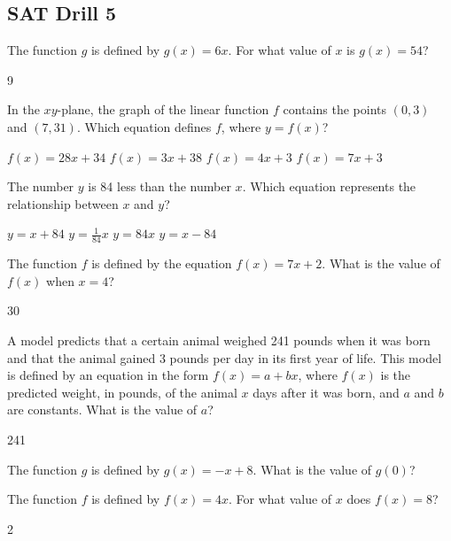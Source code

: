 
\subsection*{SAT Drill 5}

\question[1]
The function $g$ is defined by $g(x)=6x$. For what value of $x$ is $g(x)=54$?
\begin{solution}
9
\end{solution}

\question[1]
In the $xy$-plane, the graph of the linear function $f$ contains the points $(0,3)$ and $(7,31)$. Which equation defines $f$, where $y=f(x)$?
\begin{choices}
  \choice $f(x)=28x+34$
  \choice $f(x)=3x+38$
  \CorrectChoice $f(x)=4x+3$
  \choice $f(x)=7x+3$
\end{choices}

\question[1]
The number $y$ is 84 less than the number $x$. Which equation represents the relationship between $x$ and $y$?
\begin{choices}
  \choice $y=x+84$
  \choice $y=\frac{1}{84}x$
  \choice $y=84x$
  \CorrectChoice $y=x-84$
\end{choices}

\question[1]
The function $f$ is defined by the equation $f(x)=7x+2$. What is the value of $f(x)$ when $x=4$?
\begin{solution}
30
\end{solution}


\newpage


\question[1]
A model predicts that a certain animal weighed 241 pounds when it was born and that the animal gained 3 pounds per day in its first year of life. This model is defined by an equation in the form $f(x)=a+bx$, where $f(x)$ is the predicted weight, in pounds, of the animal $x$ days after it was born, and $a$ and $b$ are constants. What is the value of $a$?
\begin{solution}
241
\end{solution}

\question[1]
The function $g$ is defined by $g(x)=-x+8$. What is the value of $g(0)$?
\begin{choices}
\end{choices}

\question[1]
The function $f$ is defined by $f(x)=4x$. For what value of $x$ does $f(x)=8$?
\begin{solution}
2
\end{solution}


